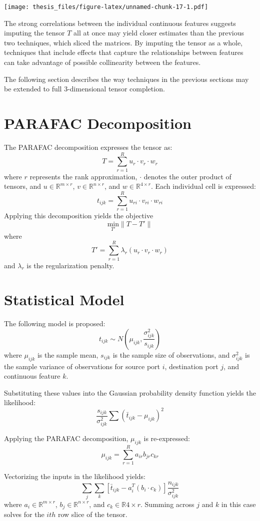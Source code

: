 \documentclass[12pt,twoside]{dukestatscithesis}
\theoremstyle{definition}
\theoremstyle{definition}
\theoremstyle{definition}
\theoremstyle{remark}
\begin{document}
\texttt{[image: thesis\_files/figure-latex/unnamed-chunk-17-1.pdf]}

The strong correlations between the individual continuous features
suggests imputing the tensor \(T\) all at once may yield closer
estimates than the previous two techniques, which sliced the matrices.
By imputing the tensor as a whole, techniques that include effects that
capture the relationships between features can take advantage of
possible collinearity between the features.

The following section describes the way techniques in the previous
sections may be extended to full 3-dimensional tensor completion.

\section{PARAFAC Decomposition}\label{parafac-decomposition}

The PARAFAC decomposition expresses the tensor as:
\[T = \sum_{r=1}^Ru_r \cdotp v_r \cdotp w_r\] where \(r\) represents the
rank approximation, \(\cdotp\) denotes the outer product of tensors, and
\(u \in \mathbb{R}^{m \times r}\), \(v \in \mathbb{R}^{n \times r}\),
and \(w \in \mathbb{R}^{4 \times r}\). Each individual cell is
expressed: \[t_{ijk} = \sum_{r=1}^Ru_{ri} \cdotp v_{ri} \cdotp w_{ri}\]
Applying this decomposition yields the objective
\[\underset{T'} {\text{min}}\|T-T'\|\] where
\[T' = \sum_{r=1}^R\lambda_r(u_r \cdotp v_r \cdotp w_r)\] and
\(\lambda_r\) is the regularization penalty.

\section{Statistical Model}\label{statistical-model}

The following model is proposed:
\[t_{ijk} \sim N(\mu_{ijk}, \frac{\sigma^2_{ijk}}{s_{ijk}})\] where
\(\mu_{ijk}\) is the sample mean, \(s_{ijk}\) is the sample size of
observations, and \(\sigma^2_{ijk}\) is the sample variance of
observations for source port \(i\), destination port \(j\), and
continuous feature \(k\).

Substituting these values into the Gaussian probability density function
yields the likelihood:
\[\frac{s_{ijk}}{\sigma^2_{ijk}}\sum(\bar t_{ijk} - \mu_{ijk})^2\]

Applying the PARAFAC decomposition, \(\mu_{ijk}\) is re-expressed:
\[\mu_{ijk} = \sum_{r=1}^Ra_{ir}b_{jr}c_{kr}\]

Vectorizing the inputs in the likelihood yields:
\[\sum_j\sum_k[\bar t_{ijk} - a_i^T(b_i \cdotp c_k)]\frac{n_{ijk}}{\sigma^2_{ijk}}\]
where \(a_i \in \mathbb{R}^{m \times r}\),
\(b_j \in \mathbb{R}^{n \times r}\), and
\(c_k \in \mathbb{R}{4 \times r}\). Summing across \(j\) and \(k\) in
this case solves for the \(ith\) row slice of the tensor.
\end{document}
